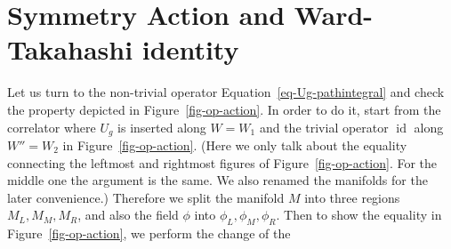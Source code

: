 \documentclass[
  letterpaper,
  DIV=11,
  numbers=noendperiod]{scrreport}
\DeclareMathOperator{\id}{id}
\begin{document}
\hypertarget{symmetry-action-and-ward-takahashi-identity}{%
\section{Symmetry Action and Ward-Takahashi
identity}\label{symmetry-action-and-ward-takahashi-identity}}

Let us turn to the non-trivial operator
Equation~\ref{eq-Ug-pathintegral} and check the property depicted in
Figure~\ref{fig-op-action}. In order to do it, start from the correlator
where \(U_g\) is inserted along \(W=W_1\) and the trivial operator
\(\id\) along \(W''=W_2\) in Figure~\ref{fig-op-action}. (Here we only
talk about the equality connecting the leftmost and rightmost figures of
Figure~\ref{fig-op-action}. For the middle one the argument is the same.
We also renamed the manifolds for the later convenience.) Therefore we
split the manifold \(M\) into three regions \(M_L,M_M,M_R\), and also
the field \(\phi\) into \(\phi_L,\phi_M,\phi_R\). Then to show the
equality in Figure~\ref{fig-op-action}, we perform the change of the
\end{document}
